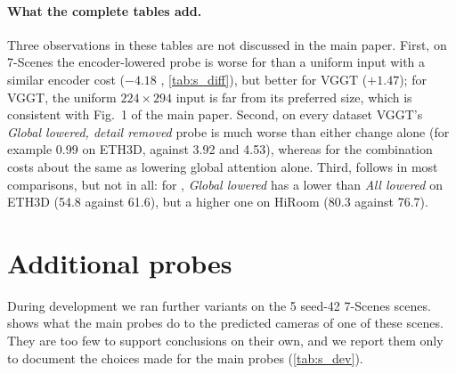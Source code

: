 \documentclass[10pt,twocolumn,letterpaper]{article}
\begin{document}
\paragraph{What the complete tables add.}
Three observations in these tables are not discussed in the main paper. First, on 7-Scenes the encoder-lowered probe is worse for \pithree than a uniform input with a similar encoder cost ($-4.18$ \auc, \cref{tab:s_diff}), but better for VGGT ($+1.47$); for VGGT, the uniform $224{\times}294$ input is far from its preferred size, which is consistent with Fig.~1 of the main paper. Second, on every dataset VGGT's \emph{Global lowered, detail removed} probe is much worse than either change alone (for example 0.99 \auc on ETH3D, against 3.92 and 4.53), whereas for \pithree the combination costs about the same as lowering global attention alone. Third, \aucc follows \auc in most comparisons, but not in all: for \pithree, \emph{Global lowered} has a lower \aucc than \emph{All lowered} on ETH3D (54.8 against 61.6), but a higher one on HiRoom (80.3 against 76.7).

\section{Additional probes}
\label{sec:s_extra}

During development we ran further variants on the 5 seed-42 7-Scenes scenes.  shows what the main probes do to the predicted cameras of one of these scenes. They are too few to support conclusions on their own, and we report them only to document the choices made for the main probes (\cref{tab:s_dev}).
\end{document}
